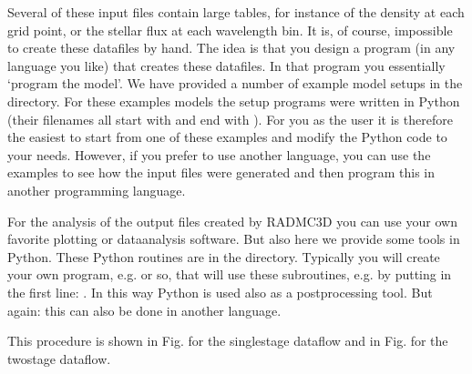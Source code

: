 \documentclass[letterpaper,10pt,english]{sphinxmanual}
\begin{document}
Several of these input files contain large tables, for instance of the density
at each grid point, or the stellar flux at each wavelength bin. It is, of
course, impossible to create these datafiles by hand. The idea is that you
design a program (in any language you like) that creates these datafiles. In
that program you essentially ‘program the model’. We have provided a number of
example model setups in the  directory. For these examples models
the setup programs were written in Python (their filenames all start with
 and end with ). For you as the user it is therefore the
easiest to start from one of these examples and modify the Python code to your
needs. However, if you prefer to use another language, you can use the examples
to see how the input files were generated and then program this in another
programming language.

  

For the analysis of the output files created by RADMC\sphinxhyphen{}3D you can use your own
favorite plotting or data\sphinxhyphen{}analysis software. But also here we provide some tools
in Python. These Python routines are in the  directory. Typically you
will create your own program, e.g.  or so, that will use
these subroutines, e.g. by putting in the first line: . In this way Python is used also as a post\sphinxhyphen{}processing tool. But again: this
can also be done in another language.

This procedure is shown in Fig. {\hyperref[\detokenize{basicstructure:fig-dataflow-basic-python}]{}} for the
single\sphinxhyphen{}stage dataflow and in Fig. {\hyperref[\detokenize{basicstructure:fig-dataflow-twostage-python}]{}} for the
two\sphinxhyphen{}stage dataflow.
\end{document}
